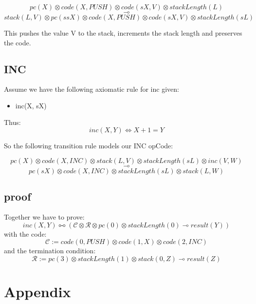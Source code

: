 \documentclass[sigconf]{acmart}
\begin{document}
  $$ pc(X)\otimes code(X, PUSH) \otimes code(sX, V)\otimes stackLength(L)$$
  $$\multimap$$
  $$stack(L, V)\otimes pc(ssX)\otimes code(X, PUSH)\otimes code(sX, V)\otimes stackLength(sL)$$

This pushes the value V to the stack, increments the stack length and preserves the code.

\subsection*{INC}

Assume we have the following axiomatic rule for inc given:

\begin{itemize}
  \item inc(X, sX)
\end{itemize}

Thus:
  $$ inc(X, Y) \Leftrightarrow X + 1 = Y$$


So the following transition rule models our INC opCode:

  $$pc(X) \otimes code(X, INC) \otimes stack(L, V) \otimes stackLength(sL) \otimes inc(V, W)$$
  $$\multimap$$
  $$pc(sX) \otimes code(X, INC) \otimes stackLength(sL) \otimes stack(L, W)$$


\subsection*{proof}

Together we have to prove:
\[ inc(X,Y) \multimapboth (\mathcal{C}\otimes \mathcal{R}\otimes pc(0)\otimes stackLength(0) \multimap result(Y)) \]
with the code:
\[ \mathcal{C} := code(0, PUSH)\otimes code(1, X) \otimes code(2, INC) \]
and the termination condition:
\[ \mathcal{R} := pc(3)\otimes stackLength(1) \otimes stack(0, Z)\multimap result(Z)\]







\section{Appendix}
\end{document}
